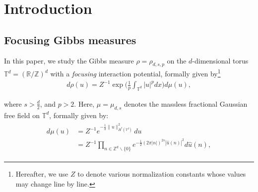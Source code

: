 \documentclass[letterpaper, 11pt,  reqno]{amsart}
\newcommand{\noi}{\noindent}
\newcommand{\Z}{\mathbb{Z}}
\newcommand{\R}{\mathbb{R}}
\newcommand{\T}{\mathbb{T}}
\newcommand{\ft}{\widehat}
\numberwithin{equation}{section}
\numberwithin{theorem}{section}
\begin{document}
\begin{abstract}
We study Gibbs measures on the $d$-dimensional torus with 
 $L^2$-(super)critical 
 focusing 
 interaction potentials.
We establish
a precise divergence rate
of the partition function
as we remove regularization, 
where the optimal constant is given by 
(i)~(the negative of) the minimum value
of the Hamiltonian given an $L^2$-constraint in the $L^2$-critical case
and 
(ii)~the optimal constant for certain Bernstein's inequality
in the mass-supercritical case.
In particular, 
our result in the  $L^2$-critical case precisely quantifies
the  phase transition of the focusing Gibbs measure
at the critical  $L^2$ threshold, 
previously studied by Lebowitz, Rose, and Speer (1988)
and Sosoe, Tolomeo, and the fourth author (2022).
	
	
	
\end{abstract}



\maketitle	


%
\tableofcontents
%






\newpage




\section{Introduction}
\subsection{Focusing Gibbs measures}
\label{SUBSEC:1.1}

In this paper, we study the  Gibbs measure  $\rho = \rho_{d, s, p}$
on  the $d$-dimensional torus $\mathbb{T}^d = (\R/\Z)^d$
with a {\it focusing} interaction potential, 
formally given by\footnote{Hereafter,
we use 
$Z$ to denote various normalization constants whose values may change line by line.}
\begin{align}
d\rho(u) = Z^{-1} \exp 
\bigg(\frac{1}{p} \int_{\mathbb{T}^d} |u|^p dx\bigg) d\mu(u), 
\label{Gibbs1}
\end{align}


\noi
where $s>\frac d2$, 
and $p >2$.
Here, $\mu = \mu_{d, s}$ 
denotes  the
massless fractional Gaussian free field
 on $\mathbb{T}^d$, formally given by:
\begin{align}
\begin{split}
d  \mu (u) &  = Z^{-1} e^{-\frac12 \|u \|_{\dot H^s(\T^d)}^2} d u \\
& = Z^{-1} \prod_{n \in \mathbb{Z}^d\backslash\{0\}}  e^{-\frac12  (2\pi |n|)^{2s} |\ft u(n)|^2} d \ft u (n),
\end{split}
\label{gauss1}
\end{align}
\end{document}
